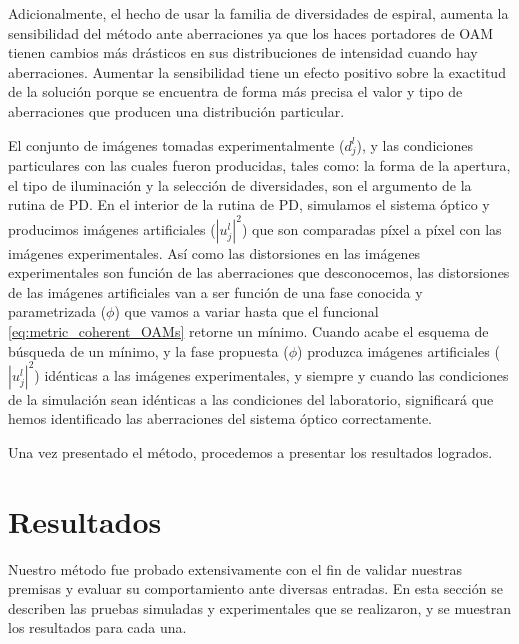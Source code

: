 Adicionalmente, el hecho de usar la familia
de diversidades de espiral, aumenta la sensibilidad del método ante
aberraciones ya que los haces portadores de OAM tienen cambios más
drásticos en sus distribuciones de intensidad cuando hay
aberraciones. Aumentar la sensibilidad tiene un efecto positivo sobre
la exactitud de la solución porque se encuentra de forma más precisa
el valor y tipo de aberraciones que producen una distribución particular. 

El conjunto de imágenes tomadas experimentalmente ($d_j^l$), y las
condiciones particulares con las cuales fueron producidas, tales como:
la forma de la apertura, el tipo de iluminación y la selección de diversidades, son el
argumento de la rutina de PD. En el interior de la rutina de PD,
simulamos el sistema óptico y producimos imágenes artificiales
($|u_j^l|^2$) que son comparadas píxel a píxel con las imágenes
experimentales. Así como las distorsiones en las imágenes
experimentales son función de las aberraciones que desconocemos, las
distorsiones de las imágenes artificiales van a ser función de una
fase conocida y parametrizada ($\phi$) que vamos a variar hasta que el funcional
\ref{eq:metric_coherent_OAMs} retorne un mínimo. 
Cuando acabe el esquema de búsqueda de un mínimo, y la fase
propuesta ($\phi$) produzca imágenes artificiales ($|u_j^l|^2$)
idénticas a las imágenes experimentales, y siempre y cuando las
condiciones de la simulación sean idénticas a las condiciones del
laboratorio, significará que hemos identificado las aberraciones del
sistema óptico correctamente.

Una vez presentado el método, procedemos a presentar los resultados
logrados. 

\section{Resultados}
\label{sec:ChPD_resultados}

Nuestro método fue probado extensivamente con el fin de validar
nuestras premisas y evaluar su comportamiento ante diversas entradas. 
En esta sección se describen las pruebas simuladas y experimentales
que se realizaron, y se muestran los resultados para cada una. 

